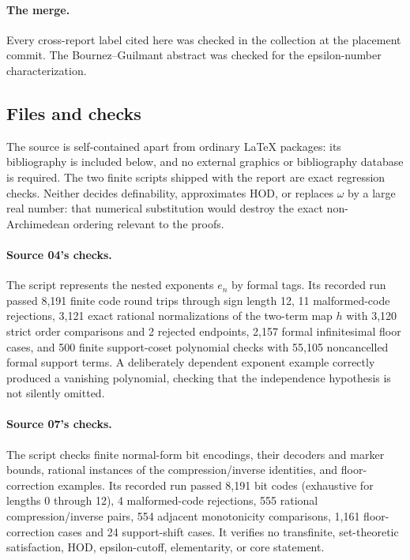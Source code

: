 \documentclass[11pt,a4paper]{article}
\numberwithin{equation}{section}
\theoremstyle{definition}
\theoremstyle{remark}
\newcommand{\HOD}{\mathrm{HOD}}
\begin{document}
\paragraph{The merge.} Every cross-report label cited here was checked in
the collection at the placement commit. The Bournez--Guilmant abstract was
checked for the epsilon-number characterization.

\subsection{Files and checks}

The source is self-contained apart from ordinary LaTeX packages: its
bibliography is included below, and no external graphics or bibliography
database is required. The two finite scripts shipped with the report are
exact regression checks. Neither decides definability, approximates
$\HOD$, or replaces $\omega$ by a large real number: that numerical
substitution would destroy the exact non-Archimedean ordering relevant to
the proofs.

\paragraph{Source 04's checks.} The script represents the nested exponents
$e_n$ by formal tags. Its recorded run passed 8,191 finite code round trips
through sign length 12, 11 malformed-code rejections, 3,121 exact rational
normalizations of the two-term map $h$ with 3,120 strict order comparisons
and 2 rejected endpoints, 2,157 formal infinitesimal floor cases, and 500
finite support-coset polynomial checks with 55,105 noncancelled formal
support terms. A deliberately dependent exponent example correctly produced
a vanishing polynomial, checking that the independence hypothesis is not
silently omitted.

\paragraph{Source 07's checks.} The script checks finite normal-form bit
encodings, their decoders and marker bounds, rational instances of the
compression/inverse identities, and floor-correction examples. Its recorded
run passed 8,191 bit codes (exhaustive for lengths 0 through 12), 4
malformed-code rejections, 555 rational compression/inverse pairs, 554
adjacent monotonicity comparisons, 1,161 floor-correction cases and 24
support-shift cases. It verifies no transfinite, set-theoretic
satisfaction, $\HOD$, epsilon-cutoff, elementarity, or core statement.
\end{document}
